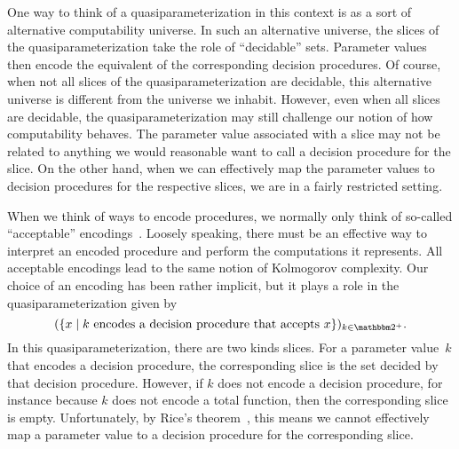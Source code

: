 One way to think of a quasiparameterization in this context is as a sort of alternative computability universe.
In such an alternative universe, the slices of the quasiparameterization take the role of \enquote{decidable} sets.
Parameter values then encode the equivalent of the corresponding decision procedures.
Of course, when not all slices of the quasiparameterization are decidable, this alternative universe is different from the universe we inhabit.
However, even when all slices are decidable, the quasiparameterization may still challenge our notion of how computability behaves.
The parameter value associated with a slice may not be related to anything we would reasonable want to call a decision procedure for the slice.
On the other hand, when we can effectively map the parameter values to decision procedures for the respective slices, we are in a fairly restricted setting.
\begin{example}
\label{ex:quasi_decision}%
  When we think of ways to encode procedures, we normally only think of so-called \enquote{acceptable} encodings~\parencite{rogers1967theory}.
  Loosely speaking, there must be an effective way to interpret an encoded procedure and perform the computations it represents.
  All acceptable encodings lead to the same notion of Kolmogorov complexity.
  Our choice of an encoding has been rather implicit, but it plays a role in the quasiparameterization given by
  \begin{equation}
  \label{eq:quasi_decision}
    (\{x \st \text{$k$ encodes a decision procedure that accepts $x$}\})_{k \in \binary^+}.
  \end{equation}
  In this quasiparameterization, there are two kinds slices.
  For a parameter value~$k$ that encodes a decision procedure, the corresponding slice is the set decided by that decision procedure.
  However, if $k$ does not encode a decision procedure, for instance because $k$ does not encode a total function, then the corresponding slice is empty.
  Unfortunately, by Rice's theorem~\parencite{rice1953classes}, this means we cannot effectively map a parameter value to a decision procedure for the corresponding slice.
\end{example}

